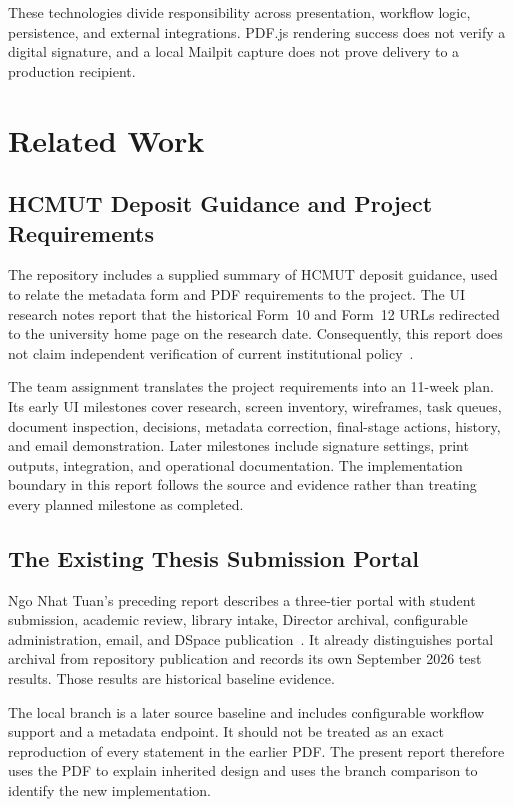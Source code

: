 \documentclass[11pt,a4paper]{report}
\newcommand{\code}[1]{{\small\texttt{\detokenize{#1}}}}
\begin{document}
These technologies divide responsibility across presentation, workflow logic, persistence, and external integrations. PDF.js rendering success does not verify a digital signature, and a local Mailpit capture does not prove delivery to a production recipient.

\chapter{Related Work}

\section{HCMUT Deposit Guidance and Project Requirements}
The repository includes a supplied summary of HCMUT deposit guidance, used to relate the metadata form and PDF requirements to the project. The UI research notes report that the historical Form~10 and Form~12 URLs redirected to the university home page on the research date. Consequently, this report does not claim independent verification of current institutional policy~\cite{ui-research}.

The team assignment translates the project requirements into an 11-week plan. Its early UI milestones cover research, screen inventory, wireframes, task queues, document inspection, decisions, metadata correction, final-stage actions, history, and email demonstration. Later milestones include signature settings, print outputs, integration, and operational documentation. The implementation boundary in this report follows the source and evidence rather than treating every planned milestone as completed.

\section{The Existing Thesis Submission Portal}
Ngo Nhat Tuan's preceding report describes a three-tier portal with student submission, academic review, library intake, Director archival, configurable administration, email, and DSpace publication~\cite{previous-report}. It already distinguishes portal archival from repository publication and records its own September 2026 test results. Those results are historical baseline evidence.

The local \code{main} branch is a later source baseline and includes configurable workflow support and a metadata endpoint. It should not be treated as an exact reproduction of every statement in the earlier PDF. The present report therefore uses the PDF to explain inherited design and uses the branch comparison to identify the new implementation.
\end{document}
